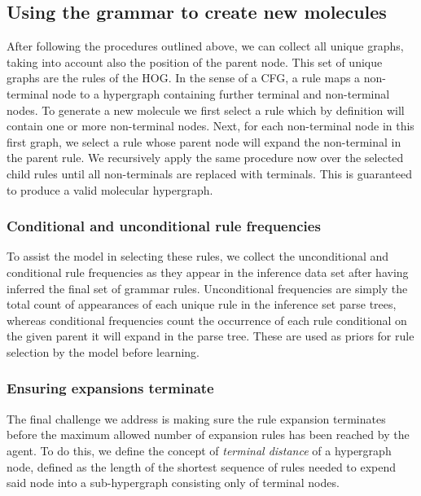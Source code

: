 \documentclass{article}
\begin{document}
\subsection{Using the grammar to create new molecules}\label{sec:grammar_usage}
After following the procedures outlined above, we can collect all unique graphs, taking into account also the position of the parent node. This set of unique graphs are the rules of the HOG. In the sense of a CFG, a rule maps a non-terminal node to a hypergraph containing further terminal and non-terminal nodes. To generate a new molecule we first select a rule which by definition will contain one or more non-terminal nodes. Next, for each non-terminal node in this first graph, we select a rule whose parent node will expand the non-terminal in the parent rule. We recursively apply the same procedure now over the selected child rules until all non-terminals are replaced with terminals. This is guaranteed to produce a valid molecular hypergraph.

\subsubsection{Conditional and unconditional rule frequencies}\label{sec:freq}
To assist the model in selecting these rules, we collect the unconditional and conditional rule frequencies as they appear in the inference data set after having inferred the final set of grammar rules. Unconditional frequencies are simply the total count of appearances of each unique rule in the inference set parse trees, whereas conditional frequencies count the occurrence of each rule conditional on the given parent it will expand in the parse tree. These are used as priors for rule selection by the model before learning.

\subsubsection{Ensuring expansions terminate}\label{sec:termination}
The final challenge we address is making sure the rule expansion terminates before the maximum allowed number of expansion rules has been reached by the agent. To do this, we define the concept of \emph{terminal distance} of a hypergraph node, defined as the length of the shortest sequence of rules needed to expend said node into a sub-hypergraph consisting only of terminal nodes. 
\end{document}

